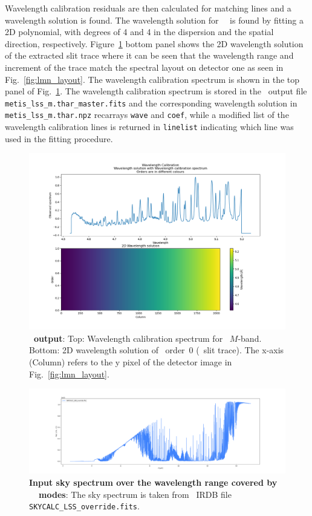 Wavelength calibration residuals are then calculated for matching lines and a wavelength solution  is found. The wavelength solution for \met~\lss~is found by fitting a 2D polynomial, with degrees of 4 and 4 in the dispersion and the spatial direction, respectively. Figure~\ref{fig:fig12} bottom panel shows the 2D wavelength solution of the extracted slit trace where it can be seen that the wavelength range and increment of the trace match the spectral layout on detector one as seen in Fig.~\ref{fig:lmn_layout}.  The wavelength calibration spectrum is shown in the top panel of Fig.~\ref{fig:fig12}. The wavelength calibration spectrum is stored in the \pyred~output file \texttt{metis\_lss\_m.thar\_master.fits} and the corresponding wavelength solution in \texttt{metis\_lss\_m.thar.npz} recarrays \texttt{wave} and \texttt{coef}, while a modified list of the wavelength calibration lines is returned  in \texttt{linelist} indicating which line was used in the fitting procedure. 

\begin{figure}[!h]
  \centering
  \includegraphics[width=\textwidth]{figures/LSS_CrtAlg_files/Figure_15.png}
  \caption{\textbf{\pyred~output}: Top: Wavelength calibration spectrum for  \lss~$M$-band. Bottom: 2D wavelength solution of \pyred~order~0 (\lss~slit trace). The x-axis (Column) refers to the y pixel of the detector image in Fig.~\ref{fig:lmn_layout}. }
  \label{fig:fig12}
\end{figure}

\begin{figure}[!h]
  \centering
  \includegraphics[width=\textwidth]{figures/LSS_CrtAlg_files/SKYCALC_LSS_override.fits.png}
  \caption{\textbf{Input sky spectrum over the wavelength range covered by \met~\lss~modes}: The sky spectrum is taken from \met~IRDB file \texttt{SKYCALC\_LSS\_override.fits}. }
  \label{fig:sky_spec}
\end{figure}

